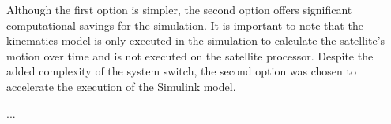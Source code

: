 Although the first option is simpler, the second option offers significant computational savings for the simulation. It is important to note that the kinematics model is only executed in the simulation to calculate the satellite's motion over time and is not executed on the satellite processor. Despite the added complexity of the system switch, the second option was chosen to accelerate the execution of the Simulink model.

...